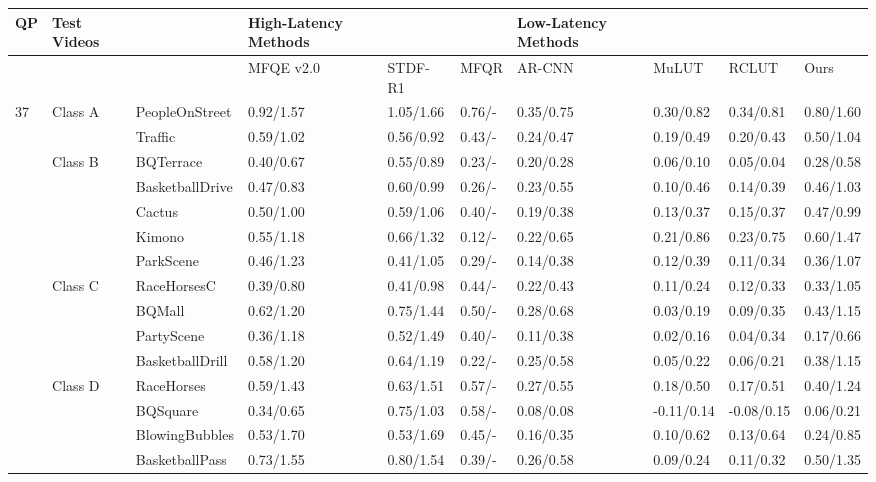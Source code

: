 \begin{tabular}{llllllllll}
\toprule
QP & Test Videos &  & High-Latency Methods &  &  & Low-Latency Methods &  &  &  \\
\midrule
 &  &  & MFQE v2.0 & STDF-R1 & MFQR & AR-CNN & MuLUT & RCLUT & Ours \\
37 & Class A & PeopleOnStreet & 0.92/1.57 & 1.05/1.66 & 0.76/- & 0.35/0.75 & 0.30/0.82 & 0.34/0.81 & 0.80/1.60 \\
 &  & Traffic & 0.59/1.02 & 0.56/0.92 & 0.43/- & 0.24/0.47 & 0.19/0.49 & 0.20/0.43 & 0.50/1.04 \\
 & Class B & BQTerrace & 0.40/0.67 & 0.55/0.89 & 0.23/- & 0.20/0.28 & 0.06/0.10 & 0.05/0.04 & 0.28/0.58 \\
 &  & BasketballDrive & 0.47/0.83 & 0.60/0.99 & 0.26/- & 0.23/0.55 & 0.10/0.46 & 0.14/0.39 & 0.46/1.03 \\
 &  & Cactus & 0.50/1.00 & 0.59/1.06 & 0.40/- & 0.19/0.38 & 0.13/0.37 & 0.15/0.37 & 0.47/0.99 \\
 &  & Kimono & 0.55/1.18 & 0.66/1.32 & 0.12/- & 0.22/0.65 & 0.21/0.86 & 0.23/0.75 & 0.60/1.47 \\
 &  & ParkScene & 0.46/1.23 & 0.41/1.05 & 0.29/- & 0.14/0.38 & 0.12/0.39 & 0.11/0.34 & 0.36/1.07 \\
 & Class C & RaceHorsesC & 0.39/0.80 & 0.41/0.98 & 0.44/- & 0.22/0.43 & 0.11/0.24 & 0.12/0.33 & 0.33/1.05 \\
 &  & BQMall & 0.62/1.20 & 0.75/1.44 & 0.50/- & 0.28/0.68 & 0.03/0.19 & 0.09/0.35 & 0.43/1.15 \\
 &  & PartyScene & 0.36/1.18 & 0.52/1.49 & 0.40/- & 0.11/0.38 & 0.02/0.16 & 0.04/0.34 & 0.17/0.66 \\
 &  & BasketballDrill & 0.58/1.20 & 0.64/1.19 & 0.22/- & 0.25/0.58 & 0.05/0.22 & 0.06/0.21 & 0.38/1.15 \\
 & Class D & RaceHorses & 0.59/1.43 & 0.63/1.51 & 0.57/- & 0.27/0.55 & 0.18/0.50 & 0.17/0.51 & 0.40/1.24 \\
 &  & BQSquare & 0.34/0.65 & 0.75/1.03 & 0.58/- & 0.08/0.08 & -0.11/0.14 & -0.08/0.15 & 0.06/0.21 \\
 &  & BlowingBubbles & 0.53/1.70 & 0.53/1.69 & 0.45/- & 0.16/0.35 & 0.10/0.62 & 0.13/0.64 & 0.24/0.85 \\
 &  & BasketballPass & 0.73/1.55 & 0.80/1.54 & 0.39/- & 0.26/0.58 & 0.09/0.24 & 0.11/0.32 & 0.50/1.35 \\

\end{tabular}
